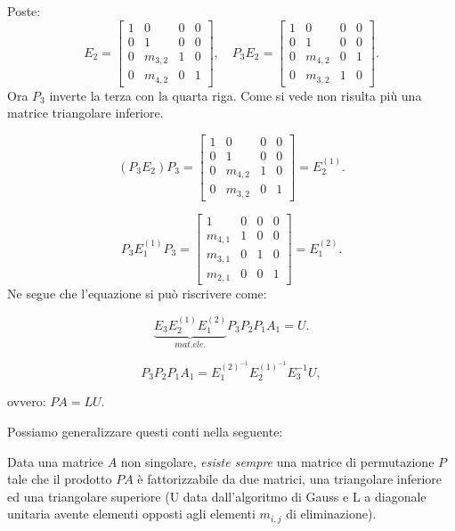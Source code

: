 Poste:
\[E_2 =
\left[\begin{array}{cccc}
1 & 0 & 0 & 0 \\
0 & 1 & 0 & 0 \\
0 & m_{3,2} & 1 & 0 \\
0 & m_{4,2} & 0 & 1
\end{array}\right],
\quad P_3E_2 =
\left[\begin{array}{cccc}
1 & 0 & 0 & 0 \\
0 & 1 & 0 & 0 \\
0 & m_{4,2} & 0 & 1 \\
0 & m_{3,2} & 1 & 0
\end{array}\right].
\]
Ora $P_3$ inverte la terza con la quarta riga. Come si vede
non risulta più una matrice triangolare inferiore.

\[(P_3E_2)P_3 =
\left[\begin{array}{cccc}
1 & 0 & 0 & 0 \\
0 & 1 & 0 & 0 \\
0 & m_{4,2} & 1 & 0 \\
0 & m_{3,2} & 0 & 1
\end{array}\right] = E_2^{(1)}.
\]

\[P_3E_1^{(1)}P_3  =
\left[\begin{array}{ccccc}
1      & 0 & 0 &  0 \\
m_{4,1} & 1 & 0 &  0 \\
m_{3,1} & 0 & 1 &  0 \\
m_{2,1} & 0 & 0 &  1
\end{array}\right]= E_1^{(2)}.
\]
Ne segue che l'equazione si può riscrivere come:

\[
\underbrace{E_3E_2^{(1)}E_1^{(2)}}_{mat. ele.}P_3P_2P_1A_1 = U.
\]

\[P_3P_2P_1A_1 = E_1^{(2)^{-1}}E_2^{(1)^{-1}}E_3^{-1}U,\]

ovvero: $PA = LU$.

\begin{flushleft}
Possiamo generalizzare questi conti nella seguente:
\end{flushleft}

\begin{defi}
Data una matrice $A$ non singolare, \emph{esiste sempre} una matrice di
permutazione $P$ tale che il prodotto $PA$ è fattorizzabile da due matrici, una
triangolare inferiore ed una triangolare superiore (U data dall'algoritmo di Gauss e L
a diagonale unitaria avente elementi opposti agli elementi $m_{i,j}$ di eliminazione).
\end{defi}

